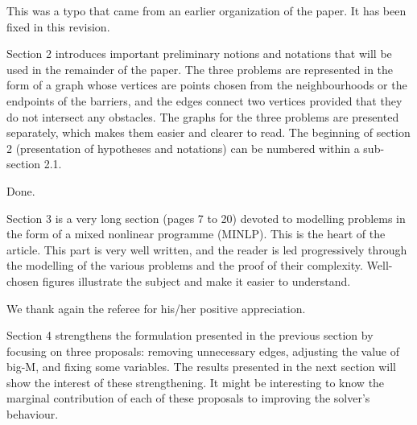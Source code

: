 \documentclass{article}
\newenvironment{reviewer}{\setcounter{pointcounter}{1}}{}
\newcommand{\point}{\text{{\selectfont \thepointcounter} \stepcounter{pointcounter}}}
\begin{document}
\begin{reviewer}
		\begin{tcolorbox}[breakable,enhanced,coltitle=black,colback=green!5!white,colframe=green!75!black,title=\textbf{Answer R2.\point},borderline={1pt}{0pt}{black},boxrule=0pt]
		This was a typo that came from an earlier organization of the paper. It has been fixed in this revision.

		\end{tcolorbox}
		
		\begin{itshape}
			Section 2 introduces important preliminary notions and notations that will be used in the remainder of the paper. The three problems are represented in the form of a graph whose vertices are points chosen from the neighbourhoods or the endpoints of the barriers, and the edges connect two vertices provided that they do not intersect any obstacles. The graphs for the three problems are presented separately, which makes them easier and clearer to read. The beginning of section 2 (presentation of hypotheses and notations) can be numbered within a sub-section 2.1.
		\end{itshape}
		
		\begin{tcolorbox}[breakable,enhanced,coltitle=black,colback=green!5!white,colframe=green!75!black,title=\textbf{Answer R2.\point},borderline={1pt}{0pt}{black},boxrule=0pt]
		Done.

		\end{tcolorbox}
		
		\begin{itshape}
			Section 3 is a very long section (pages 7 to 20) devoted to modelling problems in the form of a mixed nonlinear programme (MINLP). This is the heart of the article. This part is very well written, and the reader is led progressively through the modelling of the various problems and the proof of their complexity. Well-chosen figures illustrate the subject and make it easier to understand.
		\end{itshape}


		\begin{tcolorbox}[breakable,enhanced,coltitle=black,colback=green!5!white,colframe=green!75!black,title=\textbf{Answer R2.\point},borderline={1pt}{0pt}{black},boxrule=0pt]
			We thank again the referee for his/her positive  appreciation.
		\end{tcolorbox}
		
		\begin{itshape}
			Section 4 strengthens the formulation presented in the previous section by focusing on three proposals: removing unnecessary edges, adjusting the value of big-M, and fixing some variables. The results presented in the next section will show the interest of these strengthening. It might be interesting to know the marginal contribution of each of these proposals to improving the solver's behaviour.
		\end{itshape}
		

\end{reviewer}
\end{document}
